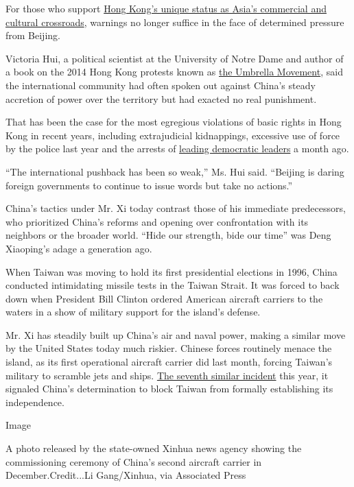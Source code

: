 For those who support
\href{https://www.nytimes.com/2020/05/23/world/asia/hong-kong-china.html}{Hong
Kong's unique status as Asia's commercial and cultural crossroads},
warnings no longer suffice in the face of determined pressure from
Beijing.

Victoria Hui, a political scientist at the University of Notre Dame and
author of a book on the 2014 Hong Kong protests known as
\href{https://www.nytimes.com/2019/04/23/world/asia/hong-kong-umbrella-movement.html}{the
Umbrella Movement}, said the international community had often spoken
out against China's steady accretion of power over the territory but had
exacted no real punishment.

That has been the case for the most egregious violations of basic rights
in Hong Kong in recent years, including extrajudicial kidnappings,
excessive use of force by the police last year and the arrests of
\href{https://www.nytimes.com/2020/04/18/world/asia/hong-kong-arrests.html}{leading
democratic leaders} a month ago.

``The international pushback has been so weak,'' Ms. Hui said. ``Beijing
is daring foreign governments to continue to issue words but take no
actions.''

China's tactics under Mr. Xi today contrast those of his immediate
predecessors, who prioritized China's reforms and opening over
confrontation with its neighbors or the broader world. ``Hide our
strength, bide our time'' was Deng Xiaoping's adage a generation ago.

When Taiwan was moving to hold its first presidential elections in 1996,
China conducted intimidating missile tests in the Taiwan Strait. It was
forced to back down when President Bill Clinton ordered American
aircraft carriers to the waters in a show of military support for the
island's defense.

Mr. Xi has steadily built up China's air and naval power, making a
similar move by the United States today much riskier. Chinese forces
routinely menace the island, as its first operational aircraft carrier
did last month, forcing Taiwan's military to scramble jets and ships.
\href{https://www.youtube.com/watch?v=PUj-vrQTT84}{The seventh similar
incident} this year, it signaled China's determination to block Taiwan
from formally establishing its independence.

Image

A photo released by the state-owned Xinhua news agency showing the
commissioning ceremony of China's second aircraft carrier in
December.Credit...Li Gang/Xinhua, via Associated Press

